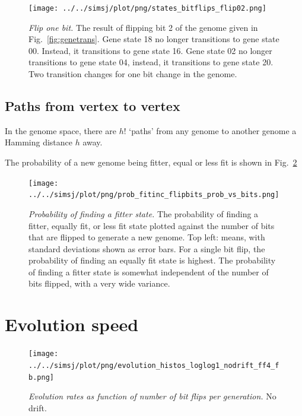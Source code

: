 \documentclass[11pt, a4paper]{article}
\begin{document}
\begin{figure}
\begin{center}
\texttt{[image: ../../simsj/plot/png/states\_bitflips\_flip02.png]}
\caption{\emph{Flip one bit.} The result of flipping bit 2 of the
genome given in Fig.~\ref{fig:genetrans}. Gene state 18 no longer
transitions to gene state 00. Instead, it transitions to gene state
16. Gene state 02 no longer transitions to gene state 04, instead, it
transitions to gene state 20. Two transition changes for one bit
change in the genome.}
\label{fig:genetrans2}
\end{center}
\end{figure}

\subsection{Paths from vertex to vertex}

In the genome space, there are $h!$ `paths' from any genome to another
genome a Hamming distance $h$ away.

The probability of a new genome being fitter, equal or less fit is
shown in Fig.~\ref{fig:prob_fitter}

\begin{figure}
\begin{center}
\texttt{[image: ../../simsj/plot/png/prob\_fitinc\_flipbits\_prob\_vs\_bits.png]}
\caption{\emph{Probability of finding a fitter state.}
The probability of finding a fitter, equally fit, or less fit state
plotted against the number of bits that are flipped to generate a new
genome. Top left: means, with standard deviations shown as error
bars. For a single bit flip, the probability of finding an equally fit
state is highest. The probability of finding a fitter state is
somewhat independent of the number of bits flipped, with a very wide variance.}
\label{fig:prob_fitter}
\end{center}
\end{figure}


\section{Evolution speed}

\begin{figure}
\begin{center}
\texttt{[image: ../../simsj/plot/png/evolution\_histos\_loglog1\_nodrift\_ff4\_fb.png]}
\caption{\emph{Evolution rates as function of number of bit flips per
generation.} No drift.}
\label{fig:ev_bf}
\end{center}
\end{figure}
\end{document}
